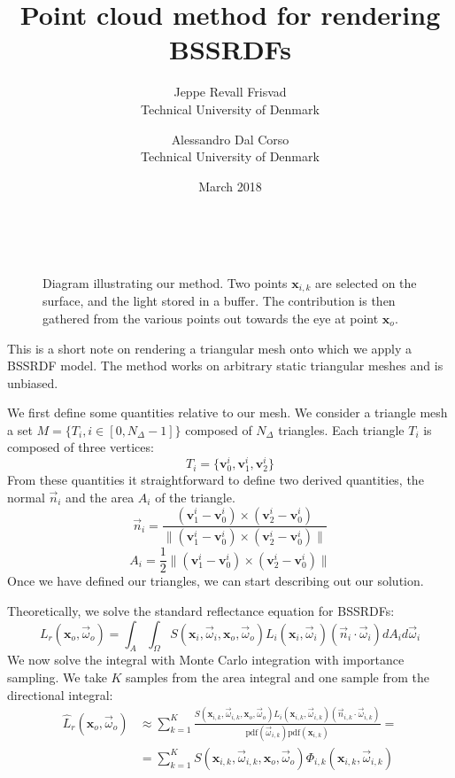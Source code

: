 \documentclass[10pt,a4paper]{article}
\title{Point cloud method for rendering BSSRDFs}
\date{March 2018}
\author{Jeppe Revall Frisvad \\ Technical University of Denmark
\and Alessandro Dal Corso \\ Technical University of Denmark}
\begin{document}
\maketitle

\begin{figure}
\centering
   \def\svgwidth{0.8\textwidth}
    \\
\caption{Diagram illustrating our method. Two points $\mathbf{x}_{i,k}$ are selected on the surface, and the light stored in a buffer. The contribution is then gathered from the various points out towards the eye at point $\mathbf{x}_o$.} 
\label{fig:vpt}
\end{figure}

This is a short note on rendering a triangular mesh onto which we apply a BSSRDF model. The method works on arbitrary static triangular meshes and is unbiased.

We first define some quantities relative to our mesh. We consider a triangle mesh a set $M = \{T_i, i \in [0, N_\Delta - 1] \}$ composed of $N_{\Delta}$ triangles. Each triangle $T_i$ is composed of three vertices:
\begin{equation*}
T_i = \{ \mathbf{v}^i_0, \mathbf{v}^i_1, \mathbf{v}^i_2 \}
\end{equation*}
From these quantities it straightforward to define two derived quantities, the normal $\vec{n}_i$ and the area $A_i$ of the triangle. 
\begin{equation*}
\vec{n}_i = \frac{(\mathbf{v}^i_1 - \mathbf{v}^i_0) \times (\mathbf{v}^i_2 - \mathbf{v}^i_0) }{ \|(\mathbf{v}^i_1 - \mathbf{v}^i_0) \times (\mathbf{v}^i_2 - \mathbf{v}^i_0)  \|}
\end{equation*}
\begin{equation*}
A_i = \frac{1}{2} \|(\mathbf{v}^i_1 - \mathbf{v}^i_0) \times (\mathbf{v}^i_2 - \mathbf{v}^i_0) \|
\end{equation*}
Once we have defined our triangles, we can start describing out our solution. 

Theoretically, we solve the standard reflectance equation for BSSRDFs:
\begin{equation*}
L_r(\mathbf{x}_o, \vec{\omega}_o) = \int_A \int_\Omega S(\mathbf{x}_i, \vec{\omega}_i, \mathbf{x}_o, \vec{\omega}_o) L_i(\mathbf{x}_i, \vec{\omega}_i) (\vec{n}_i \cdot \vec{\omega}_i) d A_i d \vec{\omega}_i 
\end{equation*}
We now solve the integral with Monte Carlo integration with importance sampling. We take $K$ samples from the area integral and one sample from the directional integral:
\begin{equation}
\label{eq:mc}
\begin{split}
\hat{L}_r(\mathbf{x}_o, \vec{\omega}_o) &\approx \sum_{k = 1}^K \frac{S(\mathbf{x}_{i,k}, \vec{\omega}_{i,k}, \mathbf{x}_o, \vec{\omega}_o) L_i(\mathbf{x}_{i,k}, \vec{\omega}_{i,k}) (\vec{n}_{i,k}\cdot \vec{\omega}_{i,k})}{\text{pdf}(\vec{\omega}_{i,k}) \text{pdf}(\mathbf{x}_{i,k})} = \\
&=  \sum_{k = 1}^K S(\mathbf{x}_{i,k}, \vec{\omega}_{i,k}, \mathbf{x}_o, \vec{\omega}_o) \Phi_{i,k}(\mathbf{x}_{i,k}, \vec{\omega}_{i,k})
\end{split}
\end{equation}
\end{document}
